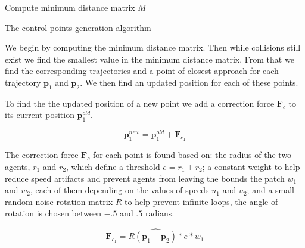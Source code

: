 \begin{algorithm}[t]
Compute minimum distance matrix $M$\;
\caption{The control points generation algorithm}
\label{algo:control-points}
\end{algorithm}


We begin by computing the minimum distance matrix. Then while collisions still exist we find the smallest value in the minimum distance matrix. From that we find the corresponding trajectories and a point of closest approach for each trajectory $\mathbf{p}_1$ and $\mathbf{p}_2$. We then find an updated position for each of these points.

To find the the updated position of a new point we add a correction force $\mathbf{F}_c$ to its current position $\mathbf{p}_1^{old}$.


\begin{equation}
	\mathbf{p}_1^{new} = \mathbf{p}_1^{old} + \mathbf{F}_{c_1}
\end{equation}



The correction force $\mathbf{F}_c$ for each point is found based on: the radius of the two agents, $r_1$ and $r_2$, which define a threshold $e=r_1+r_2$; a constant weight to help reduce speed artifacts and prevent agents from leaving the bounds the patch $w_1$ and $w_2$, each of them depending on the values of speeds $u_1$ and $u_2$; and a small random noise rotation matrix $R$ to help prevent infinite loops, the angle of rotation is chosen between $-.5$ and $.5$ radians.

\begin{equation}
	 \mathbf{F}_{c_1}= R  \widehat{(\mathbf{p}_1 - \mathbf{p}_2)}* e * w_1
\end{equation}

